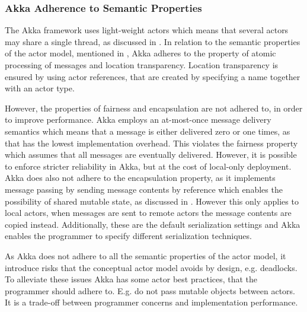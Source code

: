 \subsubsection{Akka Adherence to Semantic Properties}
The Akka framework uses light-weight actors which means that several actors may share a single thread\cite[p. 13]{akkaDoc}, as discussed in . 
In relation to the semantic properties of the actor model, mentioned in , Akka adheres to the property of atomic processing of messages and location transparency. Location transparency is ensured by using actor references, that are created by specifying a name together with an actor type\cite[p. 24]{akkaDoc}. 

However, the properties of fairness and encapsulation are not adhered to, in order to improve performance. Akka employs an at-most-once message delivery semantics which means that a message is either delivered zero or one times, as that has the lowest implementation overhead\cite[p. 27]{akkaDoc}. This violates the fairness property which assumes that all messages are eventually delivered. However, it is possible to enforce stricter reliability in Akka, but at the cost of local-only deployment\cite[p. 29]{akkaDoc}. Akka does also not adhere to the encapsulation property, as it implements message passing by sending message contents by reference which enables the possibility of shared mutable state, as discussed in . However this only applies to local actors, when messages are sent to remote actors the message contents are copied instead. Additionally, these are the default serialization settings and Akka enables the programmer to specify different serialization techniques\cite[p. 219]{akkaDoc}.

As Akka does not adhere to all the semantic properties of the actor model, it introduce risks that the conceptual actor model avoids by design, e.g. deadlocks. To alleviate these issues Akka has some actor best practices, that the programmer should adhere to. E.g. do not pass mutable objects between actors\cite[p. 12]{akkaDoc}. It is a trade-off between programmer concerns and implementation performance.


